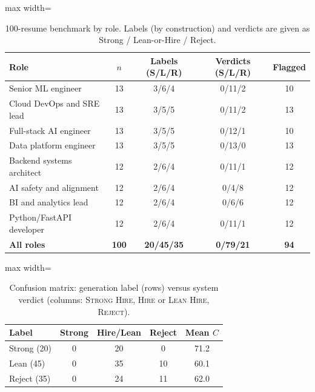 \documentclass[conference]{IEEEtran}
\newcommand{\verd}[1]{\textsc{#1}}
\newcommand{\Sstrong}{\verd{Strong Hire}}
\newcommand{\Shire}{\verd{Hire}}
\newcommand{\Slean}{\verd{Lean Hire}}
\newcommand{\Sreject}{\verd{Reject}}
\begin{document}
\begin{table}[t]
\caption{100-resume benchmark by role. Labels (by construction) and verdicts are given as Strong / Lean-or-Hire / Reject.}
\label{tab:bench}
\centering
\footnotesize
\renewcommand{\arraystretch}{1.05}
\begin{adjustbox}{max width=\columnwidth}
\begin{tabular}{@{}lcccc@{}}
\toprule
Role & $n$ & Labels (S/L/R) & Verdicts (S/L/R) & Flagged \\
\midrule
Senior ML engineer        & 13  & 3/6/4   & 0/11/2 & 10 \\
Cloud DevOps and SRE lead & 13  & 3/5/5   & 0/11/2 & 13 \\
Full-stack AI engineer    & 13  & 3/5/5   & 0/12/1 & 10 \\
Data platform engineer    & 13  & 3/5/5   & 0/13/0 & 13 \\
Backend systems architect & 12  & 2/6/4   & 0/11/1 & 12 \\
AI safety and alignment   & 12  & 2/6/4   & 0/4/8  & 12 \\
BI and analytics lead     & 12  & 2/6/4   & 0/6/6  & 12 \\
Python/FastAPI developer  & 12  & 2/6/4   & 0/11/1 & 12 \\
\midrule
\textbf{All roles}        & \textbf{100} & \textbf{20/45/35} & \textbf{0/79/21} & \textbf{94} \\
\bottomrule
\end{tabular}
\end{adjustbox}
\end{table}

\begin{table}[t]
\caption{Confusion matrix: generation label (rows) versus system verdict (columns: \Sstrong, \Shire{} or \Slean, \Sreject).}
\label{tab:confusion}
\centering
\footnotesize
\begin{adjustbox}{max width=\columnwidth}
\begin{tabular}{@{}lccc|c@{}}
\toprule
Label & Strong & Hire/Lean & Reject & Mean $C$ \\
\midrule
Strong (20) & 0 & 20 & 0  & 71.2 \\
Lean (45)   & 0 & 35 & 10 & 60.1 \\
Reject (35) & 0 & 24 & 11 & 62.0 \\
\bottomrule
\end{tabular}
\end{adjustbox}
\end{table}
\end{document}
